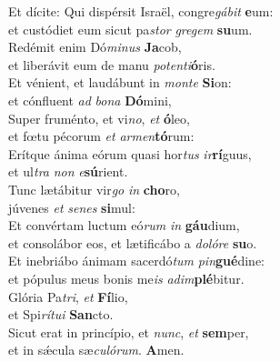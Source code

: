 \evenverse Et dícite: Qui dispérsit Israël, congre\textit{gá}\textit{bit} \textbf{e}um:~\*\\
\evenverse et custódiet eum sicut pa\textit{stor} \textit{gre}\textit{gem} \textbf{su}um.\\
\oddverse Redémit enim Dó\textit{mi}\textit{nus} \textbf{Ja}cob,~\*\\
\oddverse et liberávit eum de manu \textit{po}\textit{ten}\textit{ti}\textbf{ó}ris.\\
\evenverse Et vénient, et laudábunt in \textit{mon}\textit{te} \textbf{Si}on:~\*\\
\evenverse et cónfluent \textit{ad} \textit{bo}\textit{na} \textbf{Dó}mini,\\
\oddverse Super fruménto, et vi\textit{no}, \textit{et} \textbf{ó}leo,~\*\\
\oddverse et fœtu pécorum \textit{et} \textit{ar}\textit{men}\textbf{tó}rum:\\
\evenverse Erítque ánima eórum quasi hor\textit{tus} \textit{ir}\textbf{rí}guus,~\*\\
\evenverse et ul\textit{tra} \textit{non} \textit{e}\textbf{sú}rient.\\
\oddverse Tunc lætábitur vir\textit{go} \textit{in} \textbf{cho}ro,~\*\\
\oddverse júvenes \textit{et} \textit{se}\textit{nes} \textbf{si}mul:\\
\evenverse Et convértam luctum eó\textit{rum} \textit{in} \textbf{gáu}dium,~\*\\
\evenverse et consolábor eos, et lætificábo a \textit{do}\textit{ló}\textit{re} \textbf{su}o.\\
\oddverse Et inebriábo ánimam sacerdó\textit{tum} \textit{pin}\textbf{gué}dine:~\*\\
\oddverse et pópulus meus bonis me\textit{is} \textit{a}\textit{dim}\textbf{plé}bitur.\\
\evenverse Glória Pa\textit{tri}, \textit{et} \textbf{Fí}lio,~\*\\
\evenverse et Spi\textit{rí}\textit{tu}\textit{i} \textbf{San}cto.\\
\oddverse Sicut erat in princípio, et \textit{nunc}, \textit{et} \textbf{sem}per,~\*\\
\oddverse et in sǽcula sæ\textit{cu}\textit{ló}\textit{rum}. \textbf{A}men.\\
